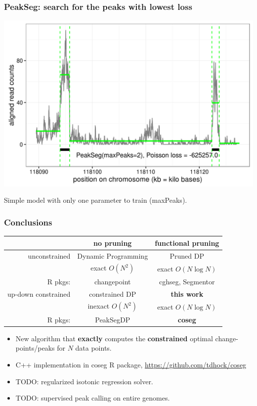 \documentclass{beamer}
\begin{document}
\begin{frame}
  \frametitle{PeakSeg: search for the peaks with lowest loss}
  \includegraphics[width=1\textwidth]{figure-macs-problem-PeakSeg.png}
  
  Simple model with only one parameter to train (maxPeaks).
\end{frame}

\begin{frame}
  \frametitle{Conclusions}
  \begin{tabular}{r|c|c}
    & no pruning & functional pruning \\
    \hline
    unconstrained & Dynamic Programming & Pruned DP \\
     & exact $O(N^2)$ & exact $O(N\log N)$\\
    R pkgs: & changepoint & cghseg, Segmentor\\
    \hline
    up-down constrained & constrained DP & \textbf{this work} \\
     & inexact $O(N^2)$ & exact $O(N\log N)$\\
    R pkgs: & PeakSegDP & \textbf{coseg}\\
    \hline
  \end{tabular}
  \begin{itemize}
  \item New algorithm that \textbf{exactly} computes the
    \textbf{constrained} optimal change-points/peaks for $N$ data points.
  \item C++ implementation in coseg R package, 
    \url{https://github.com/tdhock/coseg}
  \item TODO: regularized isotonic regression solver.
  \item TODO: supervised peak calling on entire genomes.
  \end{itemize}
\end{frame}
\end{document}
